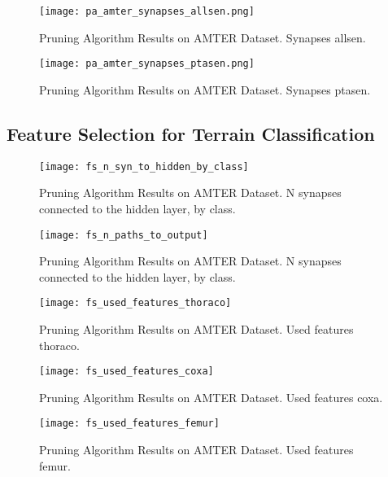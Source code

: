 \begin{figure}[H]
  \centering
  \texttt{[image: pa\_amter\_synapses\_allsen.png]}
  \caption{Pruning Algorithm Results on AMTER Dataset. Synapses allsen.}
  \label{fig:pa_amter_synapses_allsen}
\end{figure}

\begin{figure}[H]
  \centering
  \texttt{[image: pa\_amter\_synapses\_ptasen.png]}
  \caption{Pruning Algorithm Results on AMTER Dataset. Synapses ptasen.}
  \label{fig:pa_amter_synapses_ptasen}
\end{figure}

\subsection{Feature Selection for Terrain Classification} \label{ssec:pa_amter_feature_selection}

\begin{figure}[H]
  \centering
  \texttt{[image: fs\_n\_syn\_to\_hidden\_by\_class]}
  \caption{Pruning Algorithm Results on AMTER Dataset. N synapses connected to the hidden layer, by class.}
  \label{fig:pa_amter_n_syn_to_hidden_by_class}
\end{figure}

\begin{figure}[H]
  \centering
  \texttt{[image: fs\_n\_paths\_to\_output]}
  \caption{Pruning Algorithm Results on AMTER Dataset. N synapses connected to the hidden layer, by class.}
  \label{fig:pa_amter_n_syn_to_hidden_by_class}
\end{figure}

\begin{figure}[H]
  \centering
  \texttt{[image: fs\_used\_features\_thoraco]}
  \caption{Pruning Algorithm Results on AMTER Dataset. Used features thoraco.}
  \label{fig:pa_amter_used_features_thoraco}
\end{figure}

\begin{figure}[H]
  \centering
  \texttt{[image: fs\_used\_features\_coxa]}
  \caption{Pruning Algorithm Results on AMTER Dataset. Used features coxa.}
  \label{fig:pa_amter_used_features_coxa}
\end{figure}

\begin{figure}[H]
  \centering
  \texttt{[image: fs\_used\_features\_femur]}
  \caption{Pruning Algorithm Results on AMTER Dataset. Used features femur.}
  \label{fig:pa_amter_used_features_femur}
\end{figure}


